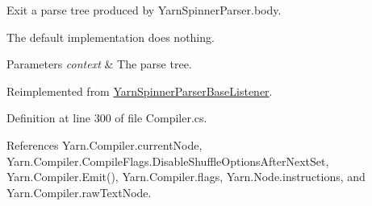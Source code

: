 Exit a parse tree produced by Yarn\-Spinner\-Parser.\-body. 

The default implementation does nothing.


\begin{DoxyParams}{Parameters}
{\em context} & The parse tree.\\
\hline
\end{DoxyParams}


Reimplemented from \hyperlink{a00175_ab0f6c8acd95f6213546c6f1f8370fd67}{Yarn\-Spinner\-Parser\-Base\-Listener}.



Definition at line 300 of file Compiler.\-cs.



References Yarn.\-Compiler.\-current\-Node, Yarn.\-Compiler.\-Compile\-Flags.\-Disable\-Shuffle\-Options\-After\-Next\-Set, Yarn.\-Compiler.\-Emit(), Yarn.\-Compiler.\-flags, Yarn.\-Node.\-instructions, and Yarn.\-Compiler.\-raw\-Text\-Node.


